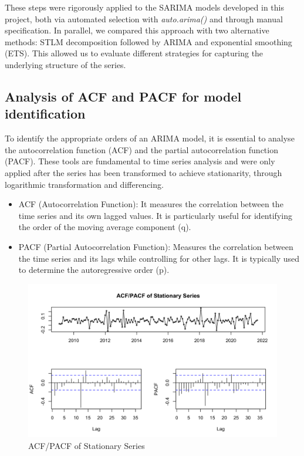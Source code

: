 These steps were rigorously applied to the SARIMA models developed in this project, both via automated selection with \textit{auto.arima()} and through manual specification. In parallel, we compared this approach with two alternative methods: STLM decomposition followed by ARIMA and exponential smoothing (ETS). This allowed us to evaluate different strategies for capturing the underlying structure of the series.

\subsection{Analysis of ACF and PACF for model identification}

To identify the appropriate orders of an ARIMA model, it is essential to analyse the autocorrelation function (ACF) and the partial autocorrelation function (PACF). These tools are fundamental to time series analysis and were only applied after the series has been transformed to achieve stationarity, through logarithmic transformation and differencing.

\begin{itemize}
    \item ACF (Autocorrelation Function): It measures the correlation between the time series and its own lagged values. It is particularly useful for identifying the order of the moving average component (q).

    \item PACF (Partial Autocorrelation Function): Measures the correlation between the time series and its lags while controlling for other lags. It is typically used to determine the autoregressive order (p).
\end{itemize}

\begin{figure}[H]
    \centering
    \includegraphics[width=1\linewidth]{images/ACF_PAC.png}
    \caption{ACF/PACF of Stationary Series}
    \label{fig:acf_pacf}
\end{figure}

